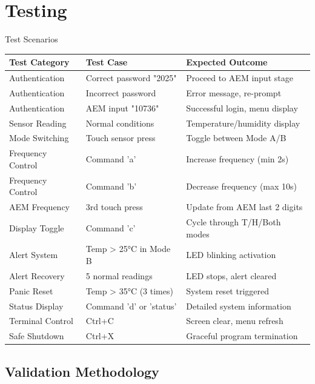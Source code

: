 \documentclass[12pt,a4paper]{article}
\begin{document}
\section{Testing}

\begin{mytitledbox}{Test Scenarios}
\begin{tabular}{@{}p{}p{}p{}@{}}
\toprule[1.5pt]
\textbf{\textcolor{myblue}{Test Category}} & \textbf{\textcolor{myblue}{Test Case}} & \textbf{\textcolor{myblue}{Expected Outcome}} \\
\midrule[0.8pt]
Authentication & Correct password "2025" & Proceed to AEM input stage \\
\rowcolor{lightbluegray!55} 
Authentication & Incorrect password & Error message, re-prompt \\
Authentication & AEM input "10736" & Successful login, menu display \\
\rowcolor{lightbluegray!55}
Sensor Reading & Normal conditions & Temperature/humidity display \\
Mode Switching & Touch sensor press & Toggle between Mode A/B \\
\rowcolor{lightbluegray!55}
Frequency Control & Command 'a' & Increase frequency (min 2s) \\
Frequency Control & Command 'b' & Decrease frequency (max 10s) \\
\rowcolor{lightbluegray!55}
AEM Frequency & 3rd touch press & Update from AEM last 2 digits \\
Display Toggle & Command 'c' & Cycle through T/H/Both modes \\
\rowcolor{lightbluegray!55}
Alert System & Temp > 25°C in Mode B & LED blinking activation \\
Alert Recovery & 5 normal readings & LED stops, alert cleared \\
\rowcolor{lightbluegray!55}
Panic Reset & Temp > 35°C (3 times) & System reset triggered \\
Status Display & Command 'd' or 'status' & Detailed system information \\
\rowcolor{lightbluegray!55}
Terminal Control & Ctrl+C & Screen clear, menu refresh \\
Safe Shutdown & Ctrl+X & Graceful program termination \\
\bottomrule[1.5pt]
\end{tabular}
\end{mytitledbox}

\subsection{Validation Methodology}
\end{document}
